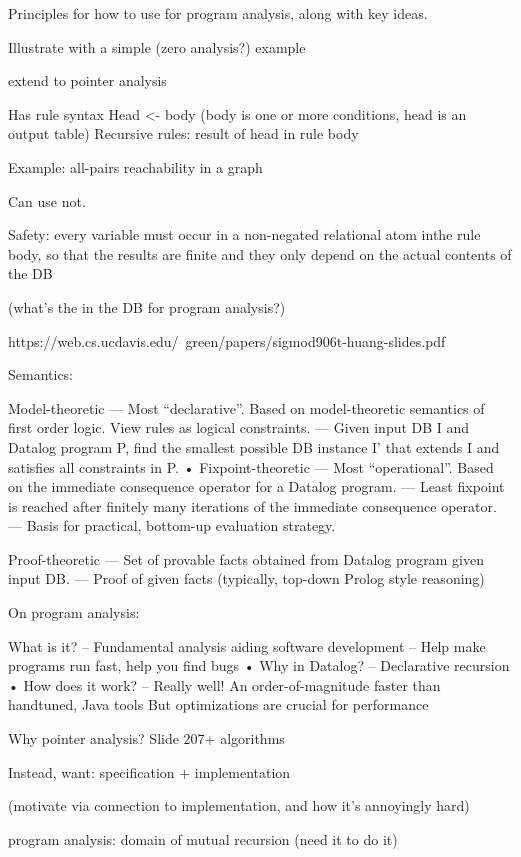 \documentclass[11pt]{article}
\begin{document}
Principles for how to use for program analysis, along with key ideas.

Illustrate with a simple (zero analysis?) example

extend to pointer analysis




Has rule syntax
Head <- body (body is one or more conditions, head is an output table)
Recursive rules: result of head in rule body

Example: all-pairs reachability in a graph

Can use not.

Safety: every variable must occur in a non-negated relational atom inthe rule
body, so that the results are finite and they only depend on the actual contents
of the DB

(what's the in the DB for program analysis?)

https://web.cs.ucdavis.edu/~green/papers/sigmod906t-huang-slides.pdf

Semantics:

Model-theoretic
— Most “declarative”. Based on model-theoretic semantics of first order
logic. View rules as logical constraints.
— Given input DB I and Datalog program P, find the smallest possible DB
instance I’ that extends I and satisfies all constraints in P.
• Fixpoint-theoretic
— Most “operational”. Based on the immediate consequence operator for
a Datalog program.
— Least fixpoint is reached after finitely many iterations of the immediate
consequence operator.
— Basis for practical, bottom-up evaluation strategy.

 Proof-theoretic
— Set of provable facts obtained from Datalog program given input DB.
— Proof of given facts (typically, top-down Prolog style reasoning)


On program analysis:

What is it?
– Fundamental analysis aiding software development
– Help make programs run fast, help you find bugs
• Why in Datalog?
– Declarative recursion
• How does it work?
– Really well! An order-of-magnitude faster than handtuned, Java tools
But optimizations are crucial for performance

Why pointer analysis? Slide 207+ algorithms

Instead, want: specification + implementation

(motivate via connection to implementation, and how it's annoyingly hard)


program analysis: domain of mutual recursion (need it  to do it)
\end{document}
